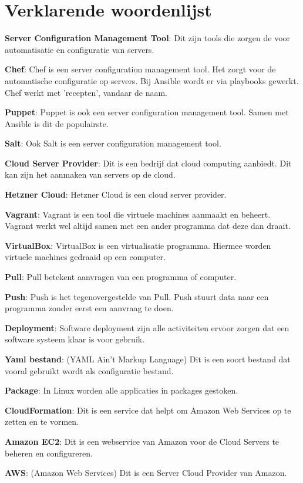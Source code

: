 \chapter{Verklarende woordenlijst}
\textbf{Server Configuration Management Tool}: Dit zijn tools die zorgen de voor automatisatie en configuratie van servers.

\textbf{Chef}: Chef is een server configuration management tool. Het zorgt voor de automatische configuratie op servers. Bij Ansible wordt er via playbooks gewerkt. Chef werkt met 'recepten', vandaar de naam.

\textbf{Puppet}: Puppet is ook een server configuration management tool. Samen met Ansible is dit de populairste.   

\textbf{Salt}: Ook Salt is een server configuration management tool.  

\textbf{Cloud Server Provider}: Dit is een bedrijf dat cloud computing aanbiedt. Dit kan zijn het aanmaken van servers op de cloud.

\textbf{Hetzner Cloud}: Hetzner Cloud is een cloud server provider.

\textbf{Vagrant}: Vagrant is een tool die virtuele machines aanmaakt en beheert. Vagrant werkt wel altijd samen met een ander programma dat deze dan draait.

\textbf{VirtualBox}: VirtualBox is een virtualisatie programma. Hiermee worden  virtuele machines gedraaid op een computer.

\textbf{Pull}: Pull betekent aanvragen van een programma of computer.

\textbf{Push}: Push is het tegenovergestelde van Pull. Push stuurt data naar een programma zonder eerst een aanvraag te doen.

\textbf{Deployment}: Software deployment zijn alle activiteiten ervoor zorgen dat een software systeem klaar is voor gebruik.

\textbf{Yaml bestand}: (YAML Ain't Markup Language) Dit is een soort bestand dat vooral gebruikt wordt als configuratie bestand.

\textbf{Package}: In Linux worden alle applicaties in packages gestoken.

\textbf{CloudFormation}: Dit is een service dat helpt om Amazon Web Services op te zetten en te vormen.

\textbf{Amazon EC2}: Dit is een webservice van Amazon voor de Cloud Servers te beheren en configureren.

\textbf{AWS}: (Amazon Web Services) Dit is een Server Cloud Provider van Amazon.

